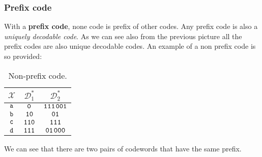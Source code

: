 \subsubsection{Prefix code}
With a \textbf{prefix code}, none code is prefix of other codes. Any prefix code is also a \textit{uniquely decodable code}.
As we can see also from the previous picture all the prefix codes are also unique decodable codes.
An example of a non prefix code is so provided:
\begin{table}[H]
	\centering
	\begin{tabular}{| c | c | c |}
		\hline
		$\mathcal{X}$ & $\mathcal{D}^*_1$ & $\mathcal{D}^*_2$\\\hline
		$\verb|a|$ & $\verb|0|$ & {\color{red}$\verb|111|$}$\verb|001|$ \\
		$\verb|b|$ & $\verb|10|$ & {\color{blue}$\verb|01|$} \\
		$\verb|c|$ & $\verb|110|$ & {\color{red}$\verb|111|$} \\
		$\verb|d|$ & $\verb|111|$ & {\color{blue}$\verb|01|$}$\verb|000|$ \\
		\hline
	\end{tabular}
	\caption{Non-prefix code.}
\end{table}
\par
We can see that there are two pairs of codewords that have the same prefix. 

